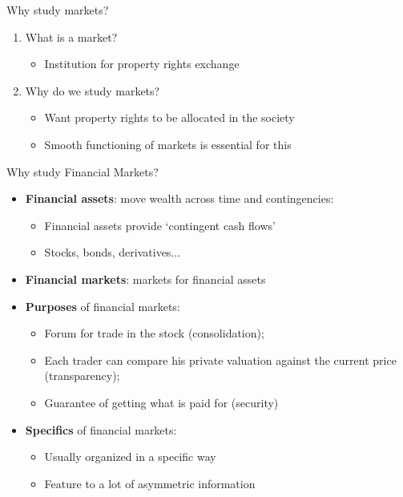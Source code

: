 \documentclass[english,10pt
,aspectratio=169
]{beamer}
\begin{document}
\begin{frame}{Why study markets?}
	\begin{enumerate}
		\item What is a market?
		\begin{itemize}
			\item Institution for property rights exchange
		\end{itemize}
		\pause
		\item Why do we study markets?
		\begin{itemize}
			\item Want property rights to be allocated  in the society
			\item Smooth functioning of markets is essential for this
		\end{itemize}
	\end{enumerate}
\end{frame}


\begin{frame}{Why study Financial Markets?}
	\begin{itemize}
		\item \textbf{Financial assets}: move wealth across time and contingencies: 
		\begin{itemize}
			\item Financial assets provide `contingent cash flows'
			\item Stocks, bonds, derivatives...
		\end{itemize}
		\item \textbf{Financial markets}: markets for financial assets
		\pause
		\item \textbf{Purposes} of financial markets:
		\begin{itemize}
			\item Forum for trade in the stock (\alert{consolidation});
			\item Each trader can compare his private valuation against the current price (\alert{transparency});
			\item Guarantee of getting what is paid for (\alert{security})
		\end{itemize}
		\item \textbf{Specifics} of financial markets:
		\begin{itemize}
			\item Usually organized in a specific way
			\item Feature to a lot of asymmetric information
		\end{itemize}
	\end{itemize}
\end{frame}
\end{document}
